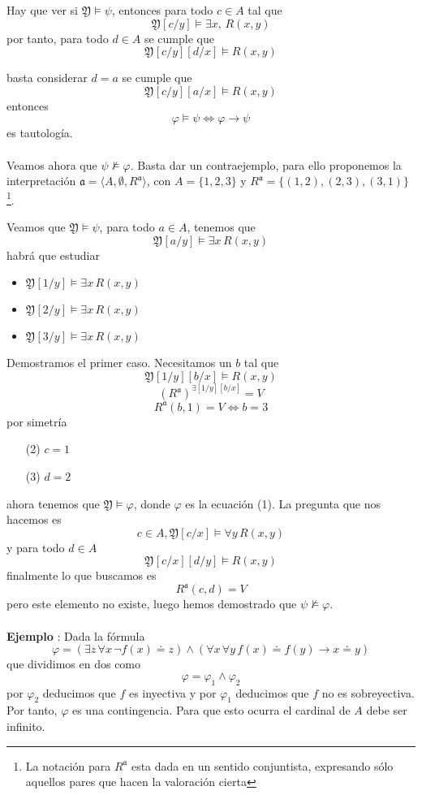 Hay que ver si $\mathfrak{Y} \models \psi$, entonces para todo $c \in A$ tal que 
\[ \mathfrak{Y}[c/y] \models \exists x, \,  R(x, y) \]
por tanto, para todo $d \in A$ se cumple que 
\[ \mathfrak{Y}[c/y][d/x] \models R(x, y) \]

basta considerar $d=a$ se cumple que   
\[ \mathfrak{Y}[c/y][a/x] \models R(x, y) \]
entonces 
\[ \varphi \models \psi \Leftrightarrow \varphi \rightarrow \psi  \]
es tautología.
\paragraph{}
Veamos ahora que $\psi \not \models \varphi$. Basta dar un contraejemplo, para ello proponemos la interpretación  $\mathfrak{a} = \langle A, \emptyset, R^{\mathfrak{a}} \rangle$, con $A =  \{1, 2, 3 \}$ y $R^{\mathfrak{a}} = \{(1, 2), (2, 3), (3, 1)\}$\footnote{La notación para $R^{\mathfrak{a}}$ esta dada en un sentido conjuntista, expresando sólo aquellos pares que hacen la valoración cierta}.

Veamos que $\mathfrak{Y} \models \psi$, para todo $a \in A$, tenemos que 
\[ \mathfrak{Y}[a/y] \models \exists x \, R(x,y) \]
habrá que estudiar 
\begin{itemize}
	\item $\mathfrak{Y}[1/y] \models \exists x \, R(x,y)$
	\item $\mathfrak{Y}[2/y] \models \exists x \, R(x,y)$
	\item $\mathfrak{Y}[3/y] \models \exists x \, R(x,y)$
\end{itemize}
Demostramos el primer caso. Necesitamos un $b$ tal que 
\[ \mathfrak{Y}[1/y][b/x] \models R(x,y) \]
\[ (R^{\mathfrak{a}})^{\exists [1/y][b/x]}=V \]
\[ R^{\mathfrak{a}}(b,1)=V \Leftrightarrow b=3 \]
por simetría  
\begin{itemize}
	\item[(2)] $c=1$
	\item[(3)] $d=2$
\end{itemize}
ahora tenemos que $\mathfrak{Y} \models \varphi$, donde $\varphi$ es la ecuación (1). La pregunta que nos hacemos es 
\[ c \in A, \mathfrak{Y}[c/x] \models \forall y \, R(x, y) \]
y para todo $d \in A$
\[ \mathfrak{Y}[c/x][d/y] \models R(x, y) \]
finalmente lo que buscamos es 
\[ R^{\mathfrak{a}}(c,d)=V \]
pero este elemento no existe, luego hemos demostrado que $\psi \not \models \varphi$.
\paragraph{}
\addtocounter{ej}{1} %
\textbf{Ejemplo }: Dada la fórmula
\begin{equation}
\varphi = (\exists z \, \forall x \, \neg f(x) \doteq z) \land (\forall x \, \forall y \, f(x) \doteq f(y) \rightarrow x \doteq y) 
\end{equation}
que dividimos en dos como 
\[ \varphi = \varphi_1 \wedge \varphi_2 \]
por $\varphi_2$ deducimos que $f$ es inyectiva y por $\varphi_1$ deducimos que $f$ no es sobreyectiva. Por tanto, $\varphi$ es una contingencia. Para que esto ocurra el cardinal de $A$ debe ser infinito. 
